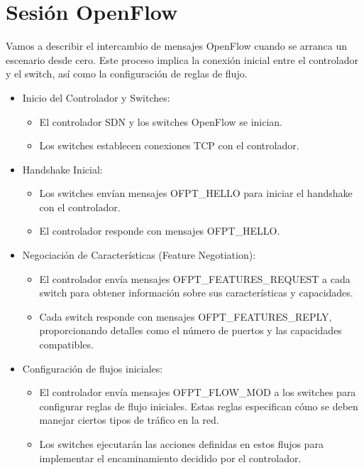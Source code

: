 \documentclass[a4paper, 12pt]{book}
\begin{document}
	\section{Sesión OpenFlow}
	Vamos a describir el intercambio de mensajes OpenFlow cuando se arranca un escenario desde cero. Este proceso implica la conexión inicial entre el controlador y el switch, así como la configuración de reglas de flujo. 
	
	\begin{itemize}
		\item Inicio del Controlador y Switches:
		\begin{itemize}
			\item El controlador SDN y los switches OpenFlow se inician.
			\item Los switches establecen conexiones TCP con el controlador.
		\end{itemize}
		
		\item Handshake Inicial:
		\begin{itemize}
			\item Los switches envían mensajes OFPT\_HELLO para iniciar el handshake con el controlador.
			\item El controlador responde con mensajes OFPT\_HELLO.
		\end{itemize}
		
		\item Negociación de Características (Feature Negotiation):
		\begin{itemize}
			\item El controlador envía mensajes OFPT\_FEATURES\_REQUEST
			a cada switch para obtener información sobre sus características y capacidades.
			\item Cada switch responde con mensajes OFPT\_FEATURES\_REPLY, proporcionando detalles como
			el número de puertos y las capacidades compatibles.
		\end{itemize}
		
		\item Configuración de flujos iniciales:
		\begin{itemize}
			\item El controlador envía mensajes OFPT\_FLOW\_MOD a los switches para configurar reglas
			de flujo iniciales. Estas reglas especifican cómo se deben manejar ciertos tipos de tráfico en la red.
			\item Los switches ejecutarán las acciones definidas en estos flujos para implementar el encaminamiento decidido por el controlador. 
		\end{itemize}
	

\end{itemize}
\end{document}
